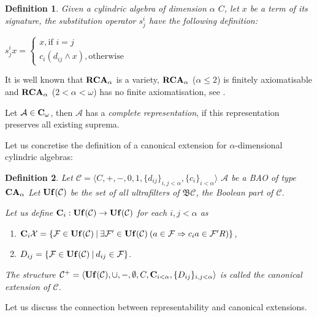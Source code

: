 \documentclass[a4paper]{article}
\theoremstyle{defin}
\newtheorem{defin}{Definition}
\theoremstyle{theorem}
\theoremstyle{prop}
\theoremstyle{lemma}
\theoremstyle{fact}
\theoremstyle{ex}
\theoremstyle{col}
\begin{document}
\begin{defin}
  Given a cylindric algebra of dimension $\alpha$ $C$, let $x$ be a term of its signature, the substitution operator $s^{i}_{j}$ have the following definition:
  \begin{center}
  $s^{i}_{j} x = \begin{cases} x, \text{if } i = j \\ c_i (d_{ij} \land x), \text{otherwise} \end{cases}$
  \end{center}
\end{defin}

It is well known that ${\bf RCA}_{\alpha}$ is a variety, ${\bf RCA}_{\alpha}$ ($\alpha \leq 2$) is finitely axiomatisable and ${\bf RCA}_{\alpha}$ ($2 < \alpha < \omega$) has no finite axiomatisation, see \cite{Henkin1988-HENCAP-4}.

Let $\mathcal{A} \in {\bf C}_{\omega}$, then $\mathcal{A}$ has a \emph{complete representation}, if this representation preserves all existing suprema.

Let us concretise the definition of a canonical extension for $\alpha$-dimensional cylindric algebras:

\begin{defin}
  Let $\mathcal{C} = \langle C, +, -, 0, 1, \{ d_{ij} \}_{i, j < \alpha}, \{c_i\}_{i < \alpha} \rangle$ $\mathcal{A}$ be a BAO of type ${\bf CA}_{\alpha}$ Let ${\bf Uf}(\mathcal{C})$ be the set of all ultrafilters of $\mathfrak{B}\mathcal{C}$, the Boolean part of $\mathcal{C}$.

  Let us define ${\bf C}_{i} : {\bf Uf}(\mathcal{C}) \to {\bf Uf}(\mathcal{C})$ for each $i, j < \alpha$ as
  \begin{enumerate}
\item ${\bf C}_{i} \mathcal{X} = \{ \mathcal{F} \in {\bf Uf}(\mathcal{C}) \: | \: \exists \mathcal{F}' \in {\bf Uf}(\mathcal{C}) \: (a \in \mathcal{F} \Rightarrow c_i a \in \mathcal{F}' R)\}$,
\item $D_{ij} = \{ \mathcal{F} \in {\bf Uf}(\mathcal{C}) \: | \: d_{ij} \in \mathcal{F} \}$.
  \end{enumerate}
  The structure $\mathcal{C}^{+} = \langle  {\bf Uf}(\mathcal{C}), \cup, -, \emptyset, C, {\bf C}_{i < \alpha}, \{D_{ij}\}_{i, j < \alpha} \rangle$ is called the canonical extension of $\mathcal{C}$.
\end{defin}

Let us discuss the connection between representability and canonical extensions.
\end{document}
